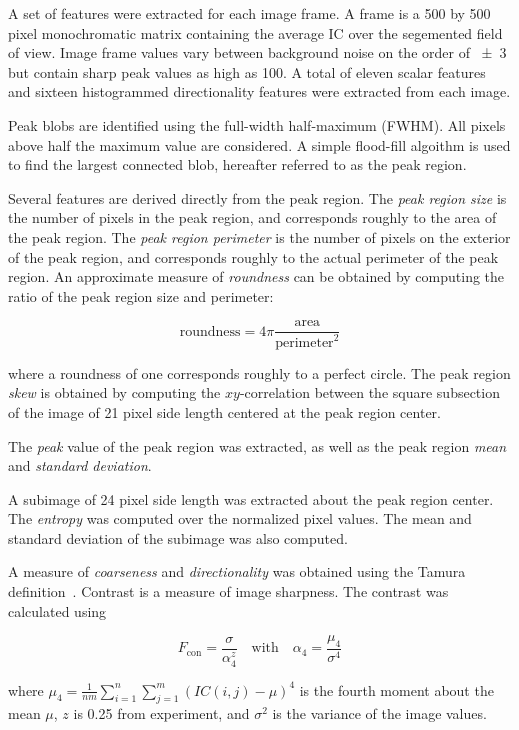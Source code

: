 \documentclass[10pt]{article}
\begin{document}
A set of features were extracted for each image frame.
A frame is a \num{500} by \num{500} pixel monochromatic matrix containing the average IC over the segemented field of view. 
Image frame values vary between background noise on the order of \num{+-3} but contain sharp peak values as high as \num{100}.
A total of eleven scalar features and sixteen histogrammed directionality features were extracted from each image.

Peak blobs are identified using the full-width half-maximum (FWHM). 
All pixels above half the maximum value are considered.
A simple flood-fill algoithm is used to find the largest connected blob, hereafter referred to as the peak region.

Several features are derived directly from the peak region.
The \emph{peak region size} is the number of pixels in the peak region, and corresponds roughly to the area of the peak region.
The \emph{peak region perimeter} is the number of pixels on the exterior of the peak region, and corresponds roughly to the actual perimeter of the peak region. 
An approximate measure of \emph{roundness} can be obtained by computing the ratio of the peak region size and perimeter:

$$
\text{roundness} = 4\pi \frac{\text{area}}{\text{perimeter}^2}
$$

\noindent
where a roundness of one corresponds roughly to a perfect circle.
The peak region \emph{skew} is obtained by computing the $xy$-correlation between the square subsection of the image of \num{21} pixel side length centered at the peak region center.

The \emph{peak} value of the peak region was extracted, as well as the peak region \emph{mean} and \emph{standard deviation}.

A subimage of \num{24} pixel side length was extracted about the peak region center.
The \emph{entropy} was computed over the normalized pixel values.
The mean and standard deviation of the subimage was also computed.

A measure of \emph{coarseness} and \emph{directionality} was obtained using the Tamura definition~\cite{Tamura1978}.
Contrast is a measure of image sharpness. 
The contrast was calculated using

$$
F_\text{con} = \frac{\sigma}{\alpha_4^z} \quad \text{with} \quad \alpha_4 = \frac{\mu_4}{\sigma^4}
$$

\noindent
where $\mu_4 = \frac{1}{nm} \sum_{i=1}^n \sum_{j=1}^m (IC(i,j)-\mu)^4$
is the fourth moment about the mean $\mu$, $z$ is \num{0.25} from experiment, and $\sigma^2$ is the variance of the image values.
\end{document}
